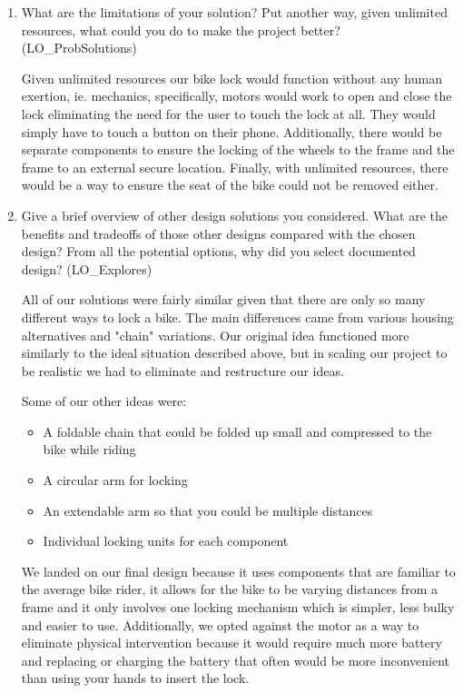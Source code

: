 \documentclass[12pt, titlepage]{article}
\begin{document}
\begin{enumerate}
  \item What are the limitations of your solution?  Put another way, given
  unlimited resources, what could you do to make the project better? (LO\_ProbSolutions)
  
  Given unlimited resources our bike lock would function without any human exertion, ie. mechanics, specifically, motors would work to open and close the lock eliminating the need for the user to touch the lock at all. They would simply have to touch a button on their phone. Additionally, there would be separate components to ensure the locking of the wheels to the frame and the frame to an external secure location.  Finally, with unlimited resources, there would be a way to ensure the seat of the bike could not be removed either.
  
  \item Give a brief overview of other design solutions you considered.  What
  are the benefits and tradeoffs of those other designs compared with the chosen
  design?  From all the potential options, why did you select documented design?
  (LO\_Explores)
  
  All of our solutions were fairly similar given that there are only so many different ways to lock a bike. The main differences came from various housing alternatives and "chain" variations. Our original idea functioned more similarly to the ideal situation described above, but in scaling our project to be realistic we had to eliminate and restructure our ideas.  
  
  Some of our other ideas were: 
  \begin{itemize}
\item A foldable chain that could be folded up small and compressed to the bike while riding
\item A circular arm for locking
\item An extendable arm so that you could be multiple distances
\item Individual locking units for each component
\end{itemize}

We landed on our final design because it uses components that are familiar to the average bike rider, it allows for the bike to be varying distances from a frame and it only involves one locking mechanism which is simpler, less bulky and easier to use. Additionally, we opted against the motor as a way to eliminate physical intervention because it would require much more battery and replacing or charging the battery that often would be more inconvenient than using your hands to insert the lock.


  
\end{enumerate}
\end{document}
